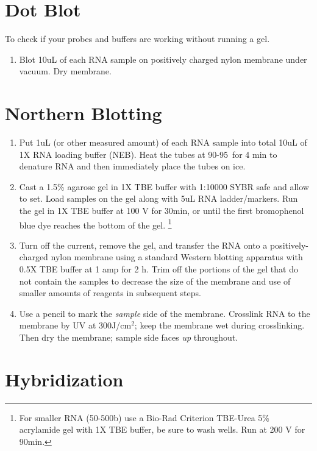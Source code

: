 \documentclass{article}
\begin{document}
\section*{Dot Blot}

To check if your probes and buffers are working without running a gel.

\begin{enumerate}
\item Blot 10uL of each RNA sample on positively charged nylon membrane under vacuum. Dry membrane.
\end{enumerate}

\section*{Northern Blotting}
\begin{enumerate}
\item Put 1uL (or other measured amount) of each RNA sample into total 10uL of 1X RNA loading buffer (NEB). Heat the tubes at 90-95\celsius\  for 4 min to denature RNA and then immediately place the tubes on ice. 
\item Cast a 1.5\% agarose gel in 1X TBE buffer with 1:10000 SYBR safe and allow to set.
Load samples on the gel along with 5uL RNA ladder/markers. Run the gel in 1X TBE buffer at 100 V for 30min, or until the first bromophenol blue dye reaches the bottom of the gel. 
\footnote{ For smaller RNA (50-500b) use a Bio-Rad Criterion TBE-Urea 5\% acrylamide gel with 1X TBE buffer, be sure to wash wells. Run at 200 V for 90min.}
\item Turn off the current, remove the gel, and transfer the RNA onto a positively-charged nylon membrane using a standard Western blotting apparatus with 0.5X TBE buffer at 1 amp for 2 h. Trim off the portions of the gel that do not contain the samples to decrease the size of the membrane and use of smaller amounts of reagents in subsequent steps.
\item Use a pencil to mark the \emph{sample} side of the membrane. Crosslink RNA to the membrane by UV at  300J/cm$^2$; keep the membrane wet during crosslinking. Then dry the membrane; sample side faces \emph{up} throughout.
\end{enumerate}

\section*{Hybridization}
\end{document}
